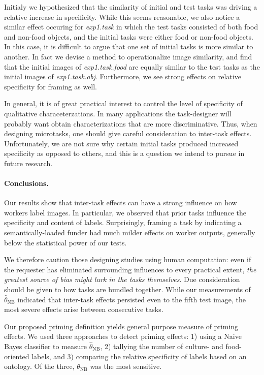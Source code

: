 \documentclass[12pt]{article}
\begin{document}
Initialy we hypothesized that the similarity of initial and test tasks was
driving a relative increase in specificity.  While this seems reasonable,
we also notice a similar effect occuring for \textit{exp1.task} in which
the test tasks consisted of both food and non-food objects, and the initial
tasks were either food or non-food objects.  In this case, it is difficult
to argue that one set of initial tasks is more similar to another.  In fact
we devise a method to operationalize image similarity, and find that 
the initial images of \textit{exp1.task.food} are equally similar to the
test tasks as the initial images of \textit{exp1.task.obj}.  Furthermore,
we see strong effects on relative specificity for framing as well.

In general, it is of great practical interest to control the level of 
specificity of qualitative characeterzations.  In many applications the
task-designer will probably want obtain characterizations that are more
discriminative.  Thus, when designing microtasks, one should give careful
consideration to inter-task effects.  Unfortunately, we are not sure
why certain initial tasks produced increased specificity as opposed to others, 
and this is a question we intend to pursue in future research.

\paragraph{Conclusions.}
Our results show that inter-task effects can have a strong influence on how 
workers label images. In particular, we observed that prior tasks influence 
the specificity and content of labels. Surprisingly, framing a task by 
indicating a semantically-loaded funder had much milder effects on worker 
outputs, generally below the statistical power of our tests.

We therefore caution those designing studies using human computation: even if 
the requester has eliminated surrounding influences to every practical extent, 
\textit{the greatest source of bias might lurk in the tasks themselves}. Due 
consideration should be given to how tasks are bundled together. While our 
measurements of $\hat{\theta}_\mathrm{NB}$ indicated that inter-task effects 
persisted even to the fifth test image, the most severe effects arise between 
consecutive tasks.

Our proposed priming definition yields general purpose measure of priming 
effects. We used three approaches to detect priming effects: 1) using a Naive 
Bayes classifier to measure $\hat{\theta}_\mathrm{NB}$, 2) tallying the 
number of culture- and food-oriented labels, and 3) comparing the relative
specificity of labels based on an ontology. Of the three, $\theta_\mathrm{NB}$ 
was the most sensitive.
\end{document}
